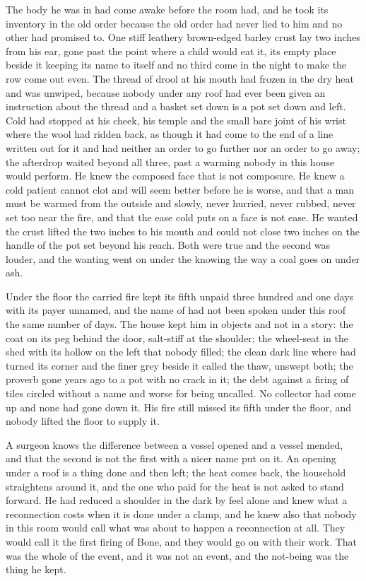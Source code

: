 The body he was in had come awake before the room had, and he took its inventory in the old order because the old order had never lied to him and no other had promised to. One stiff leathery brown-edged barley crust lay two inches from his ear, gone past the point where a child would eat it, its empty place beside it keeping its name to itself and no third come in the night to make the row come out even. The thread of drool at his mouth had frozen in the dry heat and was unwiped, because nobody under any roof had ever been given an instruction about the thread and a basket set down is a pot set down and left. Cold had stopped at his cheek, his temple and the small bare joint of his wrist where the wool had ridden back, as though it had come to the end of a line written out for it and had neither an order to go further nor an order to go away; the afterdrop waited beyond all three, past a warming nobody in this house would perform. He knew the composed face that is not composure. He knew a cold patient cannot clot and will seem better before he is worse, and that a man must be warmed from the outside and slowly, never hurried, never rubbed, never set too near the fire, and that the ease cold puts on a face is not ease. He wanted the crust lifted the two inches to his mouth and could not close two inches on the handle of the pot set beyond his reach. Both were true and the second was louder, and the wanting went on under the knowing the way a coal goes on under ash.

Under the floor the carried fire kept its fifth unpaid three hundred and one days with its payer unnamed, and the name of  had not been spoken under this roof the same number of days. The house kept him in objects and not in a story: the coat on its peg behind the door, salt-stiff at the shoulder; the wheel-seat in the shed with its hollow on the left that nobody filled; the clean dark line where  had turned its corner and the finer grey beside it called the thaw, unswept both; the proverb gone years ago to a pot with no crack in it; the debt against a firing of tiles circled without a name and worse for being uncalled. No collector had come up  and none had gone down it. His fire still missed its fifth under the floor, and nobody lifted the floor to supply it.

A surgeon knows the difference between a vessel opened and a vessel mended, and that the second is not the first with a nicer name put on it. An opening under a roof is a thing done and then left; the heat comes back, the household straightens around it, and the one who paid for the heat is not asked to stand forward. He had reduced a shoulder in the dark by feel alone and knew what a reconnection costs when it is done under a clamp, and he knew also that nobody in this room would call what was about to happen a reconnection at all. They would call it the first firing of Bone, and they would go on with their work. That was the whole of the event, and it was not an event, and the not-being was the thing he kept.

